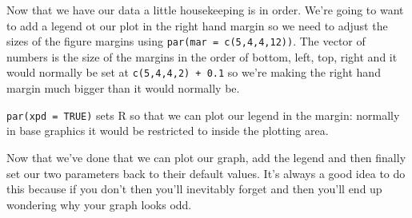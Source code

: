 \documentclass[
]{book}
\newenvironment{Shaded}{\begin{snugshade}}{\end{snugshade}}
\newcommand{\DecValTok}[1]{\textcolor[rgb]{0.00,0.00,0.81}{#1}}
\newcommand{\FloatTok}[1]{\textcolor[rgb]{0.00,0.00,0.81}{#1}}
\newcommand{\NormalTok}[1]{#1}
\newcommand{\OperatorTok}[1]{\textcolor[rgb]{0.81,0.36,0.00}{\textbf{#1}}}
\newcommand{\OtherTok}[1]{\textcolor[rgb]{0.56,0.35,0.01}{#1}}
\newcommand{\StringTok}[1]{\textcolor[rgb]{0.31,0.60,0.02}{#1}}
\begin{document}
\begin{Shaded}
\end{Shaded}

Now that we have our data a little housekeeping is in order. We're going to want to add a legend ot our plot in the right hand margin so we need to adjust the sizes of the figure margins using \texttt{par(mar\ =\ c(5,4,4,12))}. The vector of numbers is the size of the margins in the order of bottom, left, top, right and it would normally be set at \texttt{c(5,4,4,2)\ +\ 0.1} so we're making the right hand margin much bigger than it would normally be.

\texttt{par(xpd\ =\ TRUE)} sets R so that we can plot our legend in the margin: normally in base graphics it would be restricted to inside the plotting area.

Now that we've done that we can plot our graph, add the legend and then finally set our two parameters back to their default values. It's always a good idea to do this because if you don't then you'll inevitably forget and then you'll end up wondering why your graph looks odd.
\end{document}
